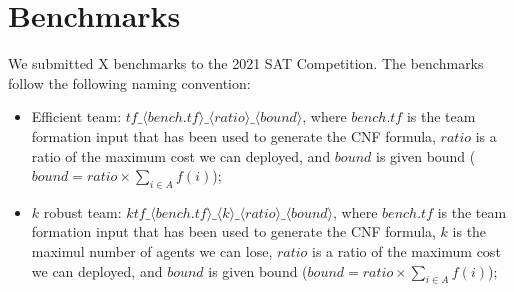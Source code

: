 \documentclass[conference]{IEEEtran}
\theoremstyle{definition}
\begin{document}
\section{Benchmarks}

We submitted X benchmarks to the 2021 SAT Competition.
The benchmarks follow the following naming convention:
\begin{itemize}
\item Efficient team: $tf\_\langle bench.tf \rangle \_\langle ratio \rangle\_\langle bound \rangle$, 
where $bench.tf$ is the team formation input that has been used to generate the CNF formula,
$ratio$ is a ratio of the maximum cost we can deployed, and $bound$ is given bound 
($bound = ratio \times \sum_{i \in A} f(i)$);
\item $k$ robust team: $ktf\_\langle bench.tf \rangle \_\langle k \rangle\_\langle ratio \rangle\_\langle bound \rangle$, where $bench.tf$ is the team formation input that has been used to generate the CNF formula,
$k$ is the maximul number of agents we can lose,
$ratio$ is a ratio of the maximum cost we can deployed, and $bound$ is given bound 
($bound = ratio \times \sum_{i \in A} f(i)$);
\end{itemize}






 

\end{document}
